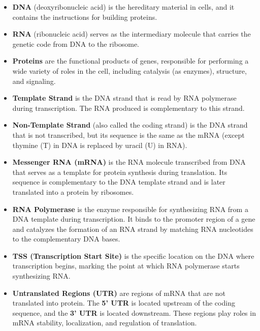 \documentclass[a4paper]{article}
\begin{document}
\begin{itemize}
  \item \textbf{DNA} (deoxyribonucleic acid) is the hereditary material in cells,
   and it contains the instructions for building proteins.

  \item \textbf{RNA} (ribonucleic acid) serves as the intermediary molecule that 
  carries the genetic code from DNA to the ribosome.

  \item \textbf{Proteins} are the functional products of genes, responsible for 
  performing a wide variety of roles in the cell, including catalysis 
  (as enzymes), structure, and signaling.

  \item \textbf{Template Strand} is the DNA strand that is read by RNA 
  polymerase during transcription. The RNA produced is complementary to this 
  strand.

  \item \textbf{Non-Template Strand} (also called the coding strand) is the 
  DNA strand that is not transcribed, but its sequence is the same as the 
  mRNA (except thymine (T) in DNA is replaced by uracil (U) in RNA).

  \item \textbf{Messenger RNA (mRNA)} is the RNA molecule transcribed from DNA 
  that serves as a template for protein synthesis during translation. 
  Its sequence is complementary to the DNA template strand and is later 
  translated into a protein by ribosomes.
  
  \item \textbf{RNA Polymerase} is the enzyme responsible for synthesizing RNA 
  from a DNA template during transcription. It binds to the promoter region of 
  a gene and catalyzes the formation of an RNA strand by matching RNA 
  nucleotides to the complementary DNA bases.
  
  \item \textbf{TSS (Transcription Start Site)} is the specific location on the 
  DNA where transcription begins, marking the point at which RNA polymerase 
  starts synthesizing RNA.

  \item \textbf{Untranslated Regions (UTR)} are regions of mRNA that are not 
  translated into protein. The \textbf{5' UTR} is located upstream of the 
  coding sequence, and the \textbf{3' UTR} is located downstream. These regions 
  play roles in mRNA stability, localization, and regulation of translation.
  

\end{itemize}
\end{document}
